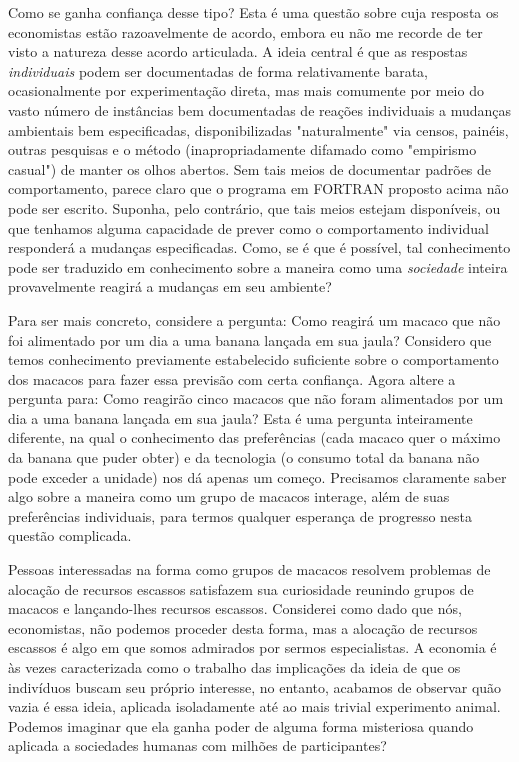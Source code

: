 \documentclass[12pt]{article}
\begin{document}
Como se ganha confiança desse tipo? Esta é uma questão sobre cuja resposta os economistas estão razoavelmente de acordo, embora eu não me recorde de ter visto a natureza desse acordo articulada. A ideia central é que as respostas \textit{individuais} podem ser documentadas de forma relativamente barata, ocasionalmente por experimentação direta, mas mais comumente por meio do vasto número de instâncias bem documentadas de reações individuais a mudanças ambientais bem especificadas, disponibilizadas "naturalmente" via censos, painéis, outras pesquisas e o método (inapropriadamente difamado como "empirismo casual") de manter os olhos abertos. Sem tais meios de documentar padrões de comportamento, parece claro que o programa em FORTRAN proposto acima não pode ser escrito. Suponha, pelo contrário, que tais meios estejam disponíveis, ou que tenhamos alguma capacidade de prever como o comportamento individual responderá a mudanças especificadas. Como, se é que é possível, tal conhecimento pode ser traduzido em conhecimento sobre a maneira como uma \textit{sociedade} inteira provavelmente reagirá a mudanças em seu ambiente?

Para ser mais concreto, considere a pergunta: Como reagirá um macaco que não foi alimentado por um dia a uma banana lançada em sua jaula? Considero que temos conhecimento previamente estabelecido suficiente sobre o comportamento dos macacos para fazer essa previsão com certa confiança. Agora altere a pergunta para: Como reagirão cinco macacos que não foram alimentados por um dia a uma banana lançada em sua jaula? Esta é uma pergunta inteiramente diferente, na qual o conhecimento das preferências (cada macaco quer o máximo da banana que puder obter) e da tecnologia (o consumo total da banana não pode exceder a unidade) nos dá apenas um começo. Precisamos claramente saber algo sobre a maneira como um grupo de macacos interage, além de suas preferências individuais, para termos qualquer esperança de progresso nesta questão complicada.

Pessoas interessadas na forma como grupos de macacos resolvem problemas de alocação de recursos escassos satisfazem sua curiosidade reunindo grupos de macacos e lançando-lhes recursos escassos. Considerei como dado que nós, economistas, não podemos proceder desta forma, mas a alocação de recursos escassos é algo em que somos admirados por sermos especialistas. A economia é às vezes caracterizada como o trabalho das implicações da ideia de que os indivíduos buscam seu próprio interesse, no entanto, acabamos de observar quão vazia é essa ideia, aplicada isoladamente até ao mais trivial experimento animal. Podemos imaginar que ela ganha poder de alguma forma misteriosa quando aplicada a sociedades humanas com milhões de participantes?
\end{document}
